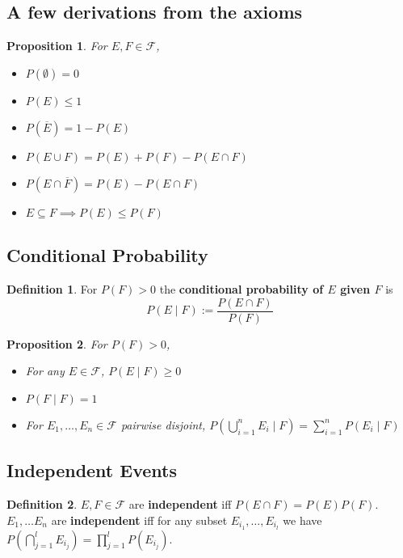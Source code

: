 \documentclass[12pt]{article}
\newtheorem*{prop*}{Proposition}
\theoremstyle{definition}
\newtheorem{defn}{Definition}[subsection]
\newcommand{\F}{\mathcal{F}}
\begin{document}
\subsection{A few derivations from the axioms}

\begin{prop*}
  For $E, F \in \F$,
  \begin{itemize}
    \item $P(\emptyset) = 0$
    \item $P(E) \leq 1$
    \item $P(\overline{E}) = 1 - P(E)$
    \item $P(E \cup F) = P(E) + P(F) - P(E \cap F)$
    \item $P(E \cap \overline{F}) = P(E) - P(E \cap F)$
    \item $E \subseteq F \implies P(E) \leq P(F)$
  \end{itemize}
\end{prop*}

\subsection{Conditional Probability}

\begin{defn}
  For $P(F) > 0$ the \textbf{conditional probability of $E$ given $F$} is
  $$P(E \mid F) := \frac{P(E \cap F)}{P(F)}$$
\end{defn}

\begin{prop*}
  For $P(F) > 0$,
  \begin{itemize}
    \item For any $E \in \F$, $P(E \mid F) \geq 0$
    \item $P(F \mid F) = 1$
    \item For $E_1, \ldots, E_n \in \F$ pairwise disjoint, $P\left(\bigcup_{i = 1}^nE_i \mid F\right) = \sum_{i = 1}^nP(E_i \mid F)$
  \end{itemize}
\end{prop*}

\subsection{Independent Events}

\begin{defn}
  $E, F \in \F$ are \textbf{independent} iff $P(E \cap F) = P(E)P(F)$.
  $E_1, \ldots E_n$ are \textbf{independent} iff for any subset $E_{i_1}, \ldots, E_{i_l}$ we have $P\left(\bigcap_{j = 1}^lE_{i_j}\right) = \prod_{j = 1}^lP(E_{i_j})$.
\end{defn}
\end{document}
